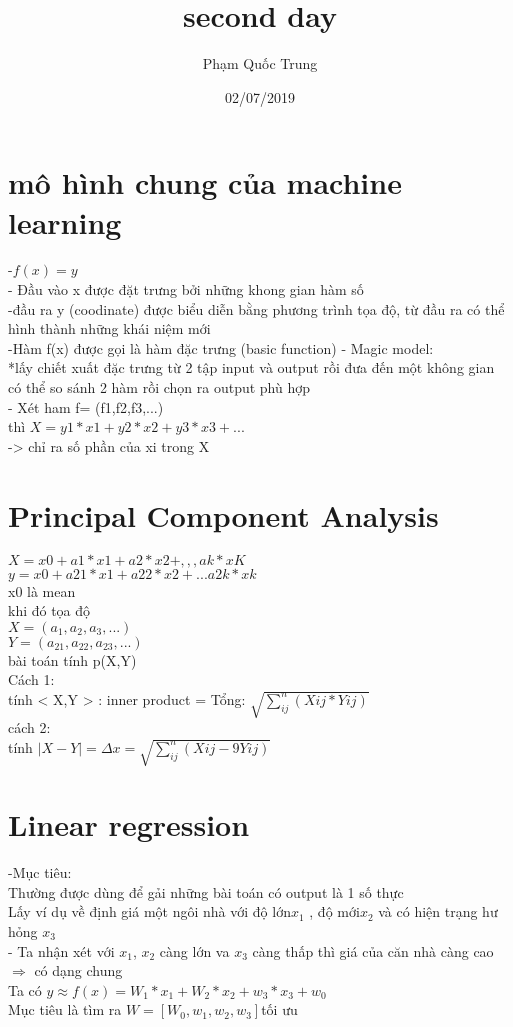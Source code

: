 \documentclass{article}
\title{second day}
\author{Phạm Quốc Trung }
\date{02/07/2019}
\begin{document}
\maketitle

\section{mô hình chung của machine learning}
-$f(x)=y$ \\
- Đầu vào x được đặt trưng bởi những khong gian hàm số\\
-đầu ra y (coodinate) được biểu diễn bằng phương trình tọa độ, từ đầu ra có  thể hình thành những khái niệm mới\\ 
-Hàm f(x) được gọi là hàm đặc trưng (basic function) 
- Magic model: \\
*lấy chiết xuất đặc trưng từ 2 tập input và output  rồi đưa đến một không gian có thể so sánh 2 hàm rồi chọn ra output phù hợp \\
- Xét ham f= (f1,f2,f3,...) \\
thì $X =y1*x1+y2*x2 +y3*x3+...$ \\
-> chỉ ra số phần của xi trong X\\
\section{Principal Component Analysis}
$ X = x0 + a1*x1 + a2*x2 + ,,, ak*xK$ \\
$ y = x0 + a21*x1 + a22*x2+...a2k*xk $ \\
 x0 là mean \\ 
khi đó tọa độ \\
$X=(a_{1},a_{2},a_{3},...)$ \\
$Y = (a_{2 1},a_{2 2},a_{2 3} ,...)$\\ 
bài toán tính  p(X,Y) \\
Cách 1: \\
tính < X,Y > : inner product = Tổng: $\sqrt{\sum_{ij}^n(Xij*Yij)}$ \\
cách 2: \\
tính $|X-Y| = \Delta x = \sqrt{ \sum_{ij}^n(Xij-9Yij)}$  \\ 
\section{Linear regression}
 -Mục tiêu:\\ Thường được dùng để gải những bài toán có output là 1 số thực \\
 Lấy ví dụ về định giá một ngôi nhà với độ lớn$ x_{1}$ , độ mới$ x_{2}$ và có hiện trạng hư hỏng $x_{3}$\\
 - Ta nhận xét với $x_{1}$, $x_{2}$ càng lớn va $x_{3}$ càng thấp thì giá của căn nhà càng cao $\Rightarrow$  có dạng chung   \\ 
 Ta có 
  $y\approx f(x) = W_{1}*x_{1}+W_{2}*x_{2}+w_{3}*x_{3}+ w_{0}$ \\
  Mục tiêu là tìm ra $W = [W_0,w_{1},w_{2},w_{3}]$tối ưu \\
\end{document}
